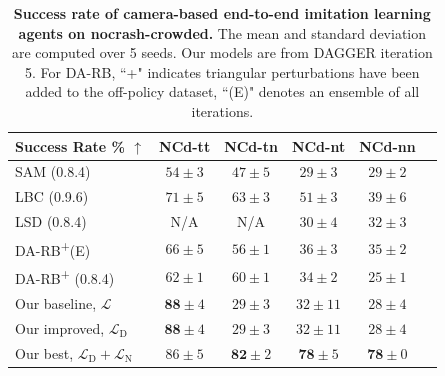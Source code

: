 \begin{table}
	\caption{\textbf{Success rate of camera-based end-to-end imitation learning agents on nocrash-crowded.}
		The mean and standard deviation are computed over 5 seeds. 
		Our models are from DAGGER iteration 5. 
		For DA-RB, ``+" indicates triangular perturbations have been added to the off-policy dataset, ``(E)" denotes an ensemble of all iterations.}
	\setlength{\tabcolsep}{6.67pt}
	\centering
	\begin{tabular}{lccccc}
		\hline
		Success Rate \% $\uparrow$
		&  NCd-tt & NCd-tn  & NCd-nt & NCd-nn  \\ 
		\hline
		SAM \cite{zhao2021sam} (0.8.4) & 
		$54 \pm 3$ & $47 \pm 5$ & $29 \pm 3$ & $29 \pm 2$ \\
		LBC \cite{chen2020learning} (0.9.6) & 
		$71 \pm 5$ & $63 \pm 3$ & $51 \pm 3$ & $39 \pm 6$ \\
		LSD \cite{ohn2020learning} (0.8.4) & 
		N/A & N/A & $30 \pm 4$ & $32 \pm 3$ \\
		DA-RB\textsuperscript{+}(E) \cite{prakash2020exploring} & 
		$66 \pm 5$ & $56 \pm 1$ & $36 \pm 3$ & $35 \pm 2$ \\
		DA-RB\textsuperscript{+} \cite{prakash2020exploring} (0.8.4)  & 
		$62 \pm 1$ & $60 \pm 1$ & $34 \pm 2$ & $25 \pm 1$ \\
		Our baseline, $\mathcal{L}$ & 
		$\mathbf{88} \pm 4$ & $29 \pm 3$ & $32 \pm 11$ & $28 \pm 4$ \\
		Our improved, $\mathcal{L}_\text{D} $ & 
		$\mathbf{88} \pm 4$ & $29 \pm 3$ & $32 \pm 11$ & $28 \pm 4$ \\
		Our best, $\mathcal{L}_\text{D}+\mathcal{L}_\text{N}$ & 
		$86 \pm 5$ & $\mathbf{82} \pm 2$ & $\mathbf{78} \pm 5$ & $\mathbf{78} \pm 0$ \\
		\hline
	\end{tabular}
	\vspace{-1ex}
	\label{table:sucess_rate_nc_dense}
	\vspace{-2ex}
\end{table}

